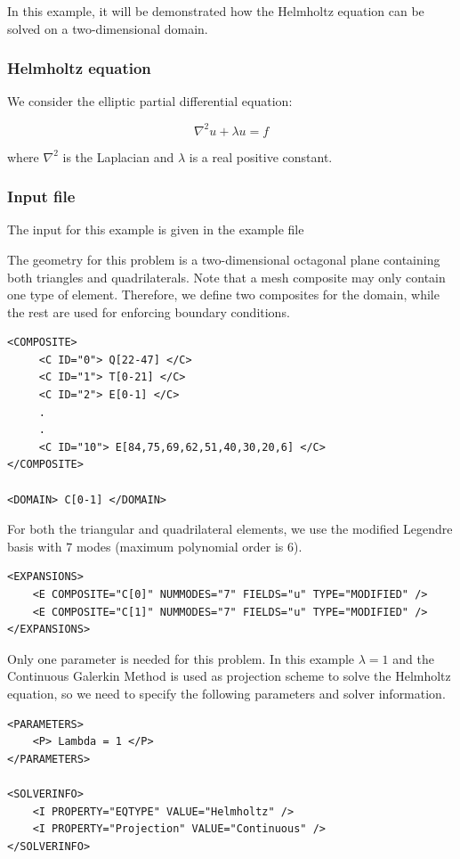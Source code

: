 In this example, it will be demonstrated how the Helmholtz equation can be solved on a two-dimensional domain.

\subsubsection{Helmholtz equation}

We consider the elliptic partial differential equation:

\begin{equation}
\nabla^2 u  + \lambda u =  f
\end{equation}

where $\nabla^2$ is the Laplacian and $\lambda$ is a real positive constant.

\subsubsection{Input file} 

The input for this example is given in the example file

The geometry for this problem is a two-dimensional octagonal plane containing
both triangles and quadrilaterals. Note that a mesh composite may only contain
one type of element. Therefore, we define two composites for the domain, while
the rest are used for enforcing boundary conditions.
\begin{lstlisting}[style=XMLStyle]
<COMPOSITE>
     <C ID="0"> Q[22-47] </C>
     <C ID="1"> T[0-21] </C>
     <C ID="2"> E[0-1] </C>
     .
     .
     <C ID="10"> E[84,75,69,62,51,40,30,20,6] </C>
</COMPOSITE>

<DOMAIN> C[0-1] </DOMAIN>
\end{lstlisting}

For both the triangular and quadrilateral elements, we use the modified Legendre
basis with $7$ modes (maximum polynomial order is $6$).
\begin{lstlisting}[style=XMLStyle]
<EXPANSIONS>
    <E COMPOSITE="C[0]" NUMMODES="7" FIELDS="u" TYPE="MODIFIED" />
    <E COMPOSITE="C[1]" NUMMODES="7" FIELDS="u" TYPE="MODIFIED" />
</EXPANSIONS>
\end{lstlisting}

Only one parameter is needed for this problem. In this example $\lambda = 1$ and
the Continuous Galerkin Method is used as projection scheme to solve the 
Helmholtz equation, so we need to specify the following parameters and solver
information.
\begin{lstlisting}[style=XMLStyle]
<PARAMETERS>
    <P> Lambda = 1 </P>
</PARAMETERS>

<SOLVERINFO>
    <I PROPERTY="EQTYPE" VALUE="Helmholtz" />
    <I PROPERTY="Projection" VALUE="Continuous" />
</SOLVERINFO>
\end{lstlisting}

